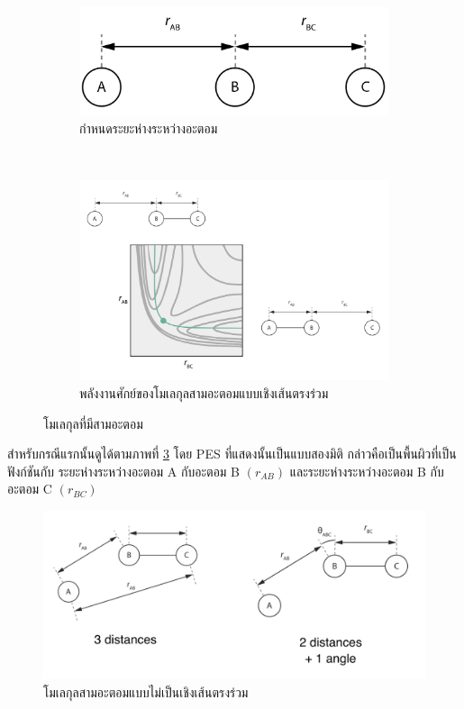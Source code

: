 \begin{figure}[H]
    \centering
    \begin{subfigure}{0.7\textwidth}
        \centering
        \includegraphics[width=\linewidth]{fig/3-body_collinear.png}
        \caption{กำหนดระยะห่างระหว่างอะตอม}
        \label{fig:3_body_mol}
    \end{subfigure}%
    \\
    \begin{subfigure}{0.9\textwidth}
        \centering
        \includegraphics[width=\linewidth]{fig/3-body_collinear_PES.png}
        \caption{พลังงานศักย์ของโมเลกุลสามอะตอมแบบเชิงเส้นตรงร่วม}
        \label{fig:PES_3_body_mol}
    \end{subfigure}
    \caption{โมเลกุลที่มีสามอะตอม}
    \label{fig:3_body_mol_and_PES}
\end{figure}

สำหรับกรณีแรกนั้นดูได้ตามภาพที่ \ref{fig:3_body_mol_and_PES} โดย PES ที่แสดงนั้นเป็นแบบสองมิติ กล่าวคือเป็นพื้นผิวที่เป็นฟังก์ชันกับ%
ระยะห่างระหว่างอะตอม A กับอะตอม B $(r_{AB})$ และระยะห่างระหว่างอะตอม B กับอะตอม C $(r_{BC})$

\begin{figure}[H]
    \centering
    \includegraphics[width=\linewidth]{fig/3-body_non-collinear.png}
    \caption{โมเลกุลสามอะตอมแบบไม่เป็นเชิงเส้นตรงร่วม}
    \label{fig:non_collinear}
\end{figure}

